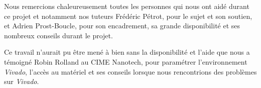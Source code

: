 Nous remercions chaleureusement toutes les personnes qui nous ont aidé durant ce projet 
et notamment nos tuteurs
Frédéric Pétrot, pour le sujet
et son soutien,
et Adrien Prost-Boucle,
pour son encadrement, sa grande disponibilité et ses nombreux conseils durant le projet.

Ce travail n’aurait pu être mené à bien sans la disponibilité et l’aide que nous a témoigné
Robin Rolland au CIME Nanotech, pour paramétrer l'environnement {\em Vivado}, l'accès au matériel
et ses conseils lorsque nous rencontrions des problèmes sur {\em Vivado}.
